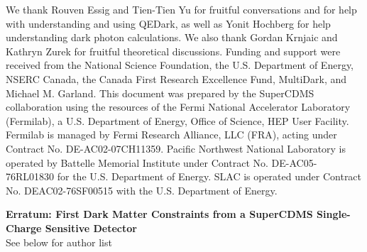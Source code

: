 \documentclass[%
reprint,
superscriptaddress,
preprintnumbers,
amsmath,amssymb,
prl,
aps,
floatfix
]{revtex4-1}
\begin{document}
\begin{acknowledgements}
We thank Rouven Essig and Tien-Tien Yu for fruitful conversations and for help with understanding and using QEDark, as well as Yonit Hochberg for help understanding dark photon calculations. We also thank Gordan Krnjaic and Kathryn Zurek for fruitful theoretical discussions. Funding and support were received from the National Science Foundation, the U.S. Department of Energy, NSERC Canada, the Canada First Research Excellence Fund, MultiDark, and Michael M. Garland. This document was prepared by the SuperCDMS collaboration using the resources of the Fermi National Accelerator Laboratory (Fermilab), a U.S. Department of Energy, Office of Science, HEP User Facility. Fermilab is managed by Fermi Research Alliance, LLC (FRA), acting under Contract No. DE-AC02-07CH11359. Pacific Northwest National Laboratory is operated by Battelle Memorial Institute under Contract No. DE-AC05-76RL01830 for the U.S. Department of Energy. SLAC is operated under Contract No. DEAC02-76SF00515 with the U.S. Department of Energy.
\end{acknowledgements}




\clearpage

\onecolumngrid
\begin{center}
{\large \bf Erratum: First Dark Matter Constraints from a SuperCDMS Single-Charge Sensitive Detector} \\[0.25cm]
See below for author list
\end{center}
\vspace{0.5cm}
\twocolumngrid
\end{document}
